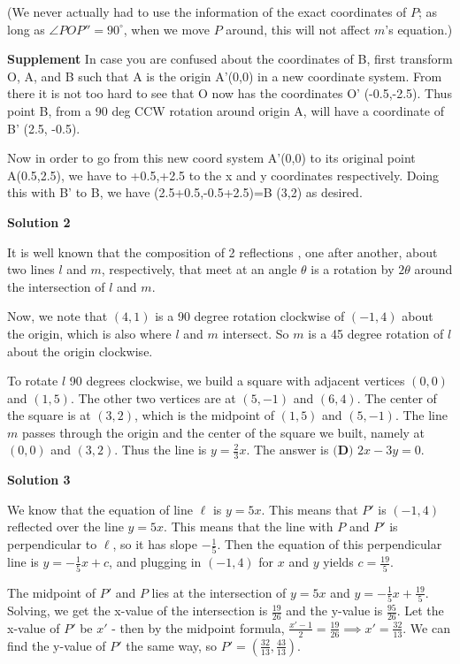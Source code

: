 \begin{enumerate}
 (We never actually had to use the information of the exact coordinates of $P$; as long as $\angle POP'' = 90^{\circ}$, when we move $P$ around, this will not affect $m$'s equation.)

 \textbf{Supplement} In case you are confused about the coordinates of B, first transform O, A, and B such that A is the origin A'(0,0) in a new coordinate system. From there it is not too hard to see that O now has the coordinates O' (-0.5,-2.5). Thus point B, from a 90 deg CCW rotation around origin A, will have a coordinate of B' (2.5, -0.5). 

 Now in order to go from this new coord system A'(0,0) to its original point A(0.5,2.5), we have to +0.5,+2.5 to the x and y coordinates respectively. Doing this with B' to B, we have (2.5+0.5,-0.5+2.5)=B (3,2) as desired.

 



\textbf{Solution 2}

It is well known that the composition of 2 reflections , one after another, about two lines $l$ and $m$, respectively, that meet at an angle $\theta$ is a rotation by $2\theta$ around the intersection of $l$ and $m$. 

 Now, we note that $(4,1)$ is a 90 degree rotation clockwise of $(-1,4)$ about the origin, which is also where $l$ and $m$ intersect. So $m$ is a 45 degree rotation of $l$ about the origin clockwise. 

 To rotate $l$ 90 degrees clockwise, we build a square with adjacent vertices $(0,0)$ and $(1,5)$. The other two vertices are at $(5,-1)$ and $(6,4)$. The center of the square is at $(3,2)$, which is the midpoint of $(1,5)$ and $(5,-1)$. The line $m$ passes through the origin and the center of the square we built, namely at $(0,0)$ and $(3,2)$. Thus the line is $y = \frac{2}{3} x$. The answer is $\boxed{\textbf{(D) } 2x-3y = 0}$.

 



\textbf{Solution 3}

We know that the equation of line $\ell$ is $y = 5x$. This means that $P'$ is $(-1,4)$ reflected over the line $y = 5x$. This means that the line with $P$ and $P'$ is perpendicular to $\ell$, so it has slope $-\frac{1}{5}$. Then the equation of this perpendicular line is $y = -\frac{1}{5}x + c$, and plugging in $(-1,4)$ for $x$ and $y$ yields $c = \frac{19}{5}$. 

 The midpoint of $P'$ and $P$ lies at the intersection of $y = 5x$ and $y = -\frac{1}{5}x + \frac{19}{5}$. Solving, we get the x-value of the intersection is $\frac{19}{26}$ and the y-value is $\frac{95}{26}$. Let the x-value of $P'$ be $x'$ - then by the midpoint formula, $\frac{x' - 1}{2} = \frac{19}{26} \implies x' = \frac{32}{13}$. We can find the y-value of $P'$ the same way, so $P' = (\frac{32}{13},\frac{43}{13})$.


\end{enumerate}
